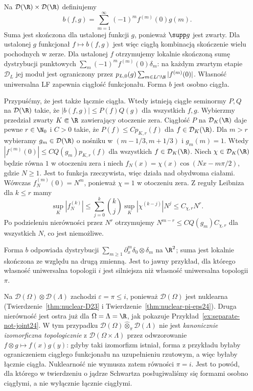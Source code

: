 \begin{przyklad}
\label{ex:separate-not-joint24}
Na $\mathcal D(\R)\times\mathcal D(\R)$ definiujemy
\[
 b(f,g)=\sum_{m=1}^\infty (-1)^m f^{(m)}(0)g(m).
\]
Suma jest skończona dla ustalonej funkcji $g$, ponieważ
$\supp g$ jest zwarty. Dla ustalonej $g$ funkcjonał
$f\mapsto b(f,g)$ jest więc ciągłą kombinacją skończenie
wielu pochodnych w zerze. Dla ustalonej $f$ otrzymujemy
lokalnie skończoną sumę dystrybucji punktowych
$\sum_m(-1)^mf^{(m)}(0)\delta_m$: na każdym zwartym
etapie $\mathcal D_L$ jej moduł jest ograniczony przez
$p_{L,0}(g)\sum_{m\in L\cap\N}|f^{(m)}(0)|$.
Własność uniwersalna LF zapewnia ciągłość funkcjonału. Forma $b$ jest osobno ciągła.

Przypuśćmy, że jest także łącznie ciągła. Wtedy istnieją
ciągłe seminormy $P,Q$ na $\mathcal D(\R)$ takie, że
$|b(f,g)|\le P(f)Q(g)$ dla wszystkich $f,g$.
Wybierzmy przedział zwarty $K\Subset\R$ zawierający
otoczenie zera. Ciągłość $P$ na $\mathcal D_K(\R)$
daje pewne $r\in\N_0$ i $C>0$ takie, że
$P(f)\le Cp_{K,r}(f)$ dla $f\in\mathcal D_K(\R)$.
Dla $m>r$ wybieramy $g_m\in\mathcal D(\R)$ o nośniku
w $(m-1/3,m+1/3)$ i $g_m(m)=1$. Wtedy
$|f^{(m)}(0)|\le CQ(g_m)p_{K,r}(f)$ dla wszystkich
$f\in\mathcal D_K(\R)$. Niech $\chi\in\mathcal D_K(\R)$
będzie równa $1$ w otoczeniu zera i niech
$f_N(x)=\chi(x)\cos(Nx-m\pi/2)$, gdzie $N\ge1$.
Jest to funkcja rzeczywista, więc działa nad obydwoma
ciałami. Wówczas $f_N^{(m)}(0)=N^m$, ponieważ
$\chi=1$ w otoczeniu zera. Z reguły Leibniza
dla $k\le r$ mamy
\[
 \sup_K|f_N^{(k)}|
 \le\sum_{j=0}^k\binom{k}{j}\sup_K|\chi^{(k-j)}|N^j
 \le C_{\chi,r}N^r.
\]
Po podzieleniu nierówności przez $N^r$ otrzymujemy
$N^{m-r}\le C Q(g_m) C_{\chi,r}$ dla wszystkich $N$,
co jest niemożliwe.

Forma $b$ odpowiada dystrybucji
$\sum_{m\ge1}\partial_x^m\delta_0\otimes\delta_m$
na $\R^2$; suma jest lokalnie skończona ze względu
na drugą zmienną. Jest to jawny przykład, dla którego
własność uniwersalna topologii $i$ jest silniejsza
niż własność uniwersalna topologii $\pi$.
\end{przyklad}

\begin{uwaga}
\label{rem:D-not-projective24}
Na $\mathcal D(\Omega)\otimes\mathcal D(\Lambda)$
zachodzi $\varepsilon=\pi\le i$, ponieważ
$\mathcal D(\Omega)$ jest nuklearna
(Twierdzenie~\ref{thm:nuclear-D23} i
Twierdzenie~\ref{thm:nuclear-pi-eps24}).
Druga nierówność jest ostra już dla $\Omega=\Lambda=\R$,
jak pokazuje Przykład~\ref{ex:separate-not-joint24}.
W tym przypadku
$\mathcal D(\Omega)\widehat\otimes_\pi\mathcal D(\Lambda)$
nie jest \emph{kanonicznie izomorficzna topologicznie}
z $\mathcal D(\Omega\times\Lambda)$ przez odwzorowanie
$f\otimes g\mapsto f(x)g(y)$: gdyby taki izomorfizm
istniał, forma z przykładu byłaby ograniczeniem
ciągłego funkcjonału na uzupełnieniu rzutowym,
a więc byłaby łącznie ciągła. Nuklearność nie wymusza
zatem równości $\pi=i$. Jest to powód, dla którego
w twierdzeniu o jądrze Schwartza posługiwaliśmy się
formami osobno ciągłymi, a nie wyłącznie łącznie ciągłymi.
\end{uwaga}

